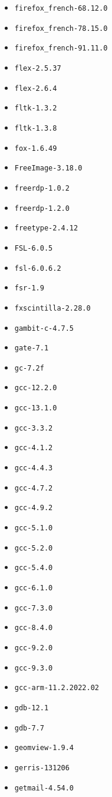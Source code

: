 \begin{multicols}{3}
\begin{itemize}
\item \verb|firefox_french-68.12.0|
\item \verb|firefox_french-78.15.0|
\item \verb|firefox_french-91.11.0|
\item \verb|flex-2.5.37|
\item \verb|flex-2.6.4|
\item \verb|fltk-1.3.2|
\item \verb|fltk-1.3.8|
\item \verb|fox-1.6.49|
\item \verb|FreeImage-3.18.0|
\item \verb|freerdp-1.0.2|
\item \verb|freerdp-1.2.0|
\item \verb|freetype-2.4.12|
\item \verb|FSL-6.0.5|
\item \verb|fsl-6.0.6.2|
\item \verb|fsr-1.9|
\item \verb|fxscintilla-2.28.0|
\item \verb|gambit-c-4.7.5|
\item \verb|gate-7.1|
\item \verb|gc-7.2f|
\item \verb|gcc-12.2.0|
\item \verb|gcc-13.1.0|
\item \verb|gcc-3.3.2|
\item \verb|gcc-4.1.2|
\item \verb|gcc-4.4.3|
\item \verb|gcc-4.7.2|
\item \verb|gcc-4.9.2|
\item \verb|gcc-5.1.0|
\item \verb|gcc-5.2.0|
\item \verb|gcc-5.4.0|
\item \verb|gcc-6.1.0|
\item \verb|gcc-7.3.0|
\item \verb|gcc-8.4.0|
\item \verb|gcc-9.2.0|
\item \verb|gcc-9.3.0|
\item \verb|gcc-arm-11.2.2022.02|
\item \verb|gdb-12.1|
\item \verb|gdb-7.7|
\item \verb|geomview-1.9.4|
\item \verb|gerris-131206|
\item \verb|getmail-4.54.0|

\end{itemize}
\end{multicols}
